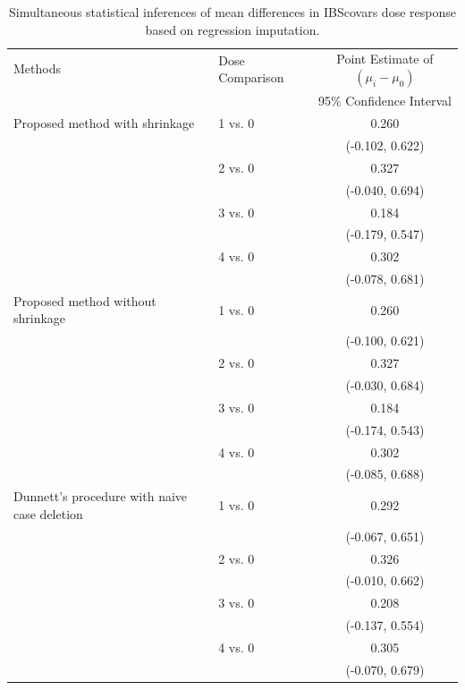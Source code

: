 \begin{table}[htbp]
\centering
\caption{Simultaneous statistical inferences of mean differences in IBScovars dose response based on regression imputation.}
\label{tab:ibs_application}
\begin{tabular}{llc}
\hline
Methods & Dose Comparison & Point Estimate of $(\mu_i-\mu_0)$ \\
 &  & 95\% Confidence Interval \\
\hline
Proposed method with shrinkage & 1 vs. 0 & 0.260 \\
 &  & (-0.102, 0.622) \\
 & 2 vs. 0 & 0.327 \\
 &  & (-0.040, 0.694) \\
 & 3 vs. 0 & 0.184 \\
 &  & (-0.179, 0.547) \\
 & 4 vs. 0 & 0.302 \\
 &  & (-0.078, 0.681) \\
Proposed method without shrinkage & 1 vs. 0 & 0.260 \\
 &  & (-0.100, 0.621) \\
 & 2 vs. 0 & 0.327 \\
 &  & (-0.030, 0.684) \\
 & 3 vs. 0 & 0.184 \\
 &  & (-0.174, 0.543) \\
 & 4 vs. 0 & 0.302 \\
 &  & (-0.085, 0.688) \\
Dunnett's procedure with naive case deletion & 1 vs. 0 & 0.292 \\
 &  & (-0.067, 0.651) \\
 & 2 vs. 0 & 0.326 \\
 &  & (-0.010, 0.662) \\
 & 3 vs. 0 & 0.208 \\
 &  & (-0.137, 0.554) \\
 & 4 vs. 0 & 0.305 \\
 &  & (-0.070, 0.679) \\
\hline
\end{tabular}
\end{table}
